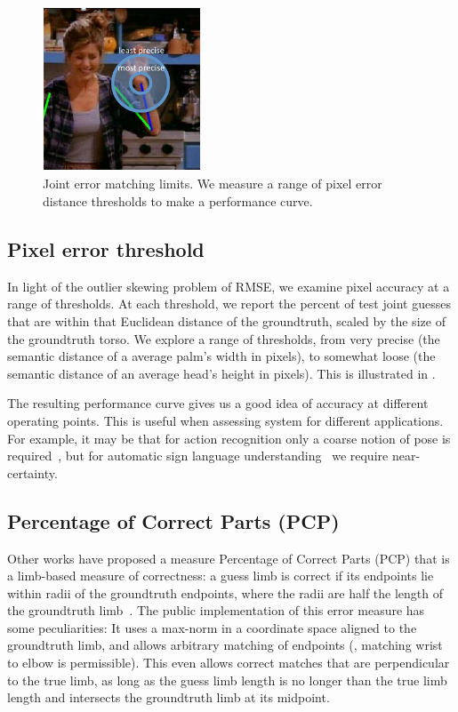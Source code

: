 \begin{figure}[t]
\begin{center}
\includegraphics[width=0.42\textwidth]{figs/pixel-err-demo}
\caption[Joint error matching limits.]{Joint error matching limits.  We measure 
a range of pixel error distance thresholds to make a performance curve.}
\label{fig:pixel-err-demo}
\end{center}
\end{figure}


\subsection{Pixel error threshold}  In light of the outlier skewing problem of 
RMSE, we examine pixel accuracy at a range of thresholds.  At each threshold, 
we report the percent of test joint guesses that are within that Euclidean 
distance of the groundtruth, scaled by the size of the groundtruth torso.  We 
explore a range of thresholds, from very precise (the semantic distance of a 
average palm's width in pixels), to somewhat loose (the semantic distance of an 
average head's height in pixels).  This is illustrated in 
.

The resulting performance curve gives us a good idea of accuracy at different 
operating points.  This is useful when assessing system for different 
applications. For example, it may be that for action recognition only a coarse 
notion of pose is required~\citep{wang2011}, but for automatic sign language 
understanding~\citep{buehler2009} we require near-certainty.

\subsection{Percentage of Correct Parts (PCP)}  Other works have proposed a 
measure Percentage of Correct Parts (PCP) that is a limb-based measure of 
correctness: a guess limb is correct if its endpoints lie within radii of the 
groundtruth endpoints, where the radii are half the length of the groundtruth 
limb~\citep{ferrari08,eichner09}.  The public implementation of this error 
measure \citep{eichner09} has some peculiarities: It uses a max-norm in a 
coordinate space aligned to the groundtruth limb, and allows arbitrary matching 
of endpoints (\eg, matching wrist to elbow is permissible).  This even allows 
correct matches that are perpendicular to the true limb, as long as the guess 
limb length is no longer than the true limb length and intersects the 
groundtruth limb at its midpoint.  

